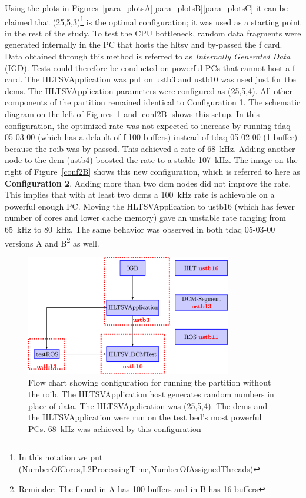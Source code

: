 \par Using the plots in Figures~\ref{para_plotsA}\ref{para_plotsB}\ref{para_plotsC} it can be claimed that 
(25,5,3)\footnote{In this notation we put (NumberOfCores,L2ProcessingTime,NumberOfAssignedThreads)} 
is the optimal configuration; it was used as a starting point in the rest of the study. 
To test the CPU bottleneck, random data fragments were generated internally in 
the PC that hosts the \acrshort{hltsv} and by-passed the \acrshort{f} card. 
Data obtained through this method is referred to as {\it Internally Generated Data} (IGD).
Tests could therefore be conducted on powerful PCs that cannot host a \acrshort{f} card. The 
HLTSVApplication was put on ustb3 and ustb10 was used just for the \acrshort{dcm}s. The HLTSVApplication 
parameters were configured as (25,5,4). All other components of the partition remained identical to Configuration 1.
The schematic diagram on the left of Figures~\ref{conf2A} and \ref{conf2B} shows this setup.
In this configuration, the optimized rate was not expected to increase by running 
tdaq 05-03-00 (which has a default of \acrshort{f} 100 buffers) instead of tdaq 05-02-00 (1 buffer) 
because the \acrshort{roib} was by-passed. This achieved a rate of 68\ kHz. 
Adding another node to the \acrshort{dcm} (ustb4) boosted the rate to a stable 107\ kHz. The 
image on the right of Figure~\ref{conf2B} shows this new configuration, which is referred to here as 
{\bf Configuration 2}. Adding more than two \acrshort{dcm} nodes did not improve the rate. This implies that 
with at least two \acrshort{dcm}s a 100\ kHz rate is achievable on a powerful 
enough PC. Moving the HLTSVApplication to ustb16 (which has fewer number of cores and lower cache memory) 
gave an unstable rate ranging from 65\ kHz to 80\ kHz. The same behavior was observed in 
both tdaq 05-03-00 versions A and B\footnote{Reminder: The \acrshort{f} card in 
A has 100 buffers and in B has 16 buffers} as well.

\begin{figure}[!h]
\centering
  \includegraphics[width=0.8\textwidth]{figures/confTest.png}
  \caption{Flow chart showing configuration for running the partition without 
the \acrshort{roib}. The HLTSVApplication host generates random numbers in place of data. 
The HLTSVApplication was (25,5,4). The \acrshort{dcm}s and the HLTSVApplication were run 
on the test bed's most powerful PCs. 68\ kHz was achieved by this configuration} 
  \label{conf2A}
\end{figure}

